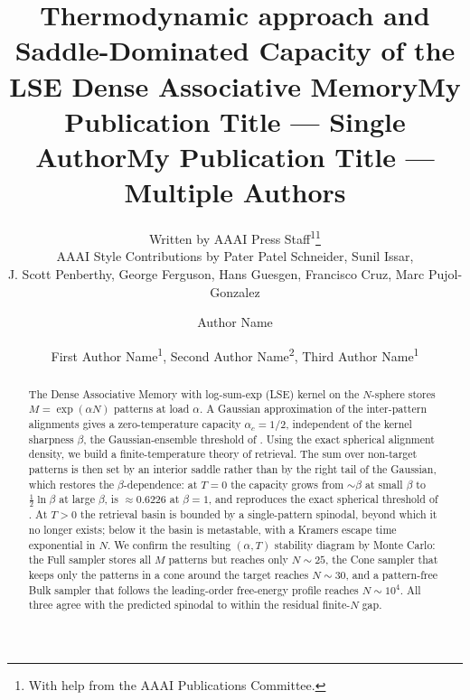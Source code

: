 \documentclass[letterpaper]{article} %
\title{\bfseries Thermodynamic approach and Saddle-Dominated Capacity
of the LSE Dense Associative Memory}
\author{
    Written by AAAI Press Staff\textsuperscript{\rm 1}\thanks{With help from the AAAI Publications Committee.}\\
    AAAI Style Contributions by Pater Patel Schneider,
    Sunil Issar,\\
    J. Scott Penberthy,
    George Ferguson,
    Hans Guesgen,
    Francisco Cruz\equalcontrib,
    Marc Pujol-Gonzalez\equalcontrib
}
\title{My Publication Title --- Single Author}
\author {
    Author Name
}
\title{My Publication Title --- Multiple Authors}
\author {
    First Author Name\textsuperscript{\rm 1},
    Second Author Name\textsuperscript{\rm 2},
    Third Author Name\textsuperscript{\rm 1}
}
\newcommand{\Bnet}{\beta}
\begin{document}
\maketitle

\begin{abstract}
The Dense Associative Memory with log-sum-exp (LSE) kernel on the $N$-sphere
stores $M = \exp(\alpha N)$ patterns at load $\alpha$. A Gaussian approximation
of the inter-pattern alignments gives a zero-temperature capacity
$\alpha_c = 1/2$, independent of the kernel sharpness $\Bnet$, the
Gaussian-ensemble threshold of \citet{lucibello2024exponential}. Using the exact
spherical alignment density, we build a finite-temperature theory of retrieval.
The sum over non-target patterns is then set by an interior saddle rather than by
the right tail of the Gaussian, which restores the $\Bnet$-dependence: at $T = 0$
the capacity grows from $\sim\Bnet$ at small $\Bnet$ to $\tfrac12 \ln\Bnet$ at
large $\Bnet$, is $\approx 0.6226$ at $\Bnet = 1$, and reproduces the exact
spherical threshold of \citeauthor{lucibello2024exponential}. At $T > 0$ the retrieval
basin is bounded by a single-pattern spinodal, beyond which it no longer exists;
below it the basin is metastable, with a Kramers escape time exponential in $N$.
We confirm the resulting $(\alpha, T)$ stability diagram by Monte Carlo: the
Full sampler stores all $M$ patterns but reaches only $N \sim 25$, the Cone
sampler that keeps only the patterns in a cone around the target reaches
$N \sim 30$, and a pattern-free Bulk sampler that follows the leading-order
free-energy profile reaches $N \sim 10^4$. All three agree with the predicted
spinodal to within the residual finite-$N$ gap.
\end{abstract}





\end{document}
